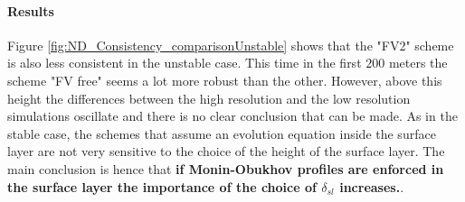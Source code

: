\paragraph{Results}
Figure \ref{fig:ND_Consistency_comparisonUnstable}
shows that the "FV2" scheme is also less consistent
in the unstable case.
This time in the first $200$ meters the scheme "FV free" seems a lot
more robust than the other.
However, above this height the differences between the high
resolution and the low resolution simulations oscillate and there
is no clear conclusion that can be made.
As in the stable case, the schemes that assume an evolution equation
inside the surface layer are not very sensitive to the choice of
the height of the surface layer.
The main conclusion is hence that
\textbf{if Monin-Obukhov profiles are enforced in the
surface layer the importance of the choice of
$\delta_{sl}$ increases.}.
